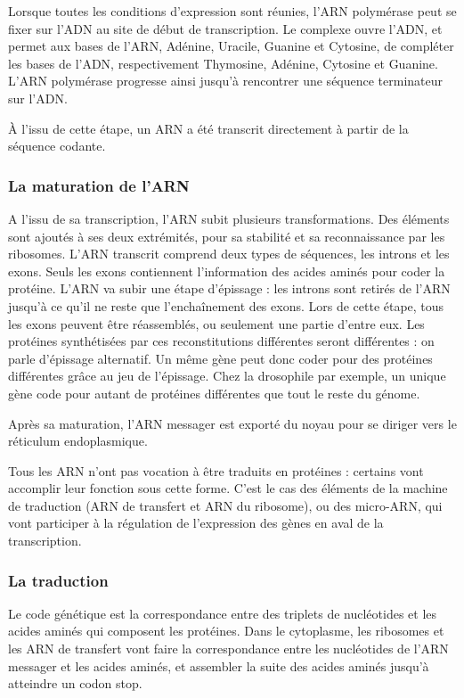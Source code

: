 \documentclass{report}
\begin{document}
Lorsque toutes les conditions d'expression sont réunies, l'ARN polymérase peut se fixer sur l'ADN au site de début de transcription. Le complexe ouvre l'ADN, et permet aux bases de l'ARN, Adénine, Uracile, Guanine et Cytosine, de compléter les bases de l'ADN, respectivement Thymosine, Adénine, Cytosine et Guanine. L'ARN polymérase progresse ainsi jusqu'à rencontrer une séquence terminateur sur l'ADN. 

À l'issu de cette étape, un ARN a été transcrit directement à partir de la séquence codante. 

\subsubsection{La maturation de l'ARN}

A l'issu de sa transcription, l'ARN subit plusieurs transformations. Des éléments sont ajoutés à ses deux extrémités, pour sa stabilité et sa reconnaissance par les ribosomes. 
L'ARN transcrit comprend deux types de séquences, les introns et les exons. Seuls les exons contiennent l'information des acides aminés pour coder la protéine. 
L'ARN va subir une étape d'épissage : les introns sont retirés de l'ARN jusqu'à ce qu'il ne reste que l'enchaînement des exons. Lors de cette étape, tous les exons peuvent être réassemblés, ou seulement une partie d'entre eux. Les protéines synthétisées par ces reconstitutions différentes seront différentes : on parle d'épissage alternatif. 
Un même gène peut donc coder pour des protéines différentes grâce au jeu de l'épissage. Chez la drosophile par exemple, un unique gène code pour autant de protéines différentes que tout le reste du génome. 

Après sa maturation, l'ARN messager est exporté du noyau pour se diriger vers le réticulum endoplasmique.

Tous les ARN n'ont pas vocation à être traduits en protéines : certains vont accomplir leur fonction sous cette forme. C'est le cas des éléments de la machine de traduction (ARN de transfert et ARN du ribosome), ou des micro-ARN, qui vont participer à la régulation de l'expression des gènes en aval de la transcription.

\subsubsection{La traduction}

Le code génétique est la correspondance entre des triplets de nucléotides et les acides aminés qui composent les protéines. 
Dans le cytoplasme, les ribosomes et les ARN de transfert vont faire la correspondance entre les nucléotides de l'ARN messager et les acides aminés, et assembler la suite des acides aminés jusqu'à atteindre un codon stop. 
\end{document}
